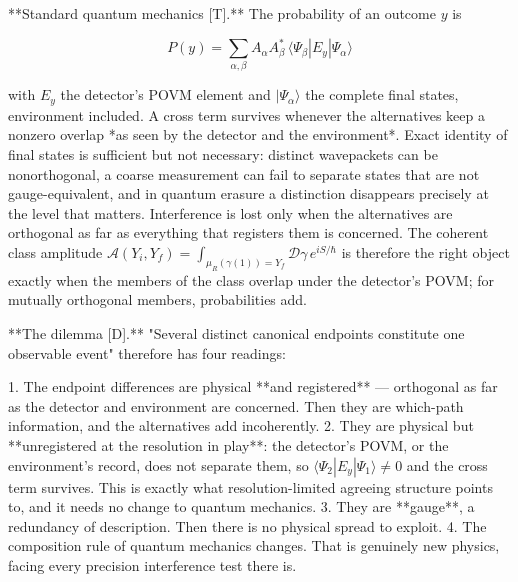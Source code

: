 **Standard quantum mechanics [T].** The probability of an outcome $y$ is

$$P(y) = \sum_{\alpha,\beta}A_\alpha A_\beta^*\,\langle\Psi_\beta|E_y|\Psi_\alpha\rangle$$

with $E_y$ the detector's POVM element and $|\Psi_\alpha\rangle$ the complete final states, environment included. A cross term survives whenever the alternatives keep a nonzero overlap *as seen by the detector and the environment*. Exact identity of final states is sufficient but not necessary: distinct wavepackets can be nonorthogonal, a coarse measurement can fail to separate states that are not gauge-equivalent, and in quantum erasure a distinction disappears precisely at the level that matters. Interference is lost only when the alternatives are orthogonal as far as everything that registers them is concerned. The coherent class amplitude $\mathcal A(Y_i,Y_f) = \int_{\mu_R(\gamma(1)) = Y_f}\mathcal D\gamma\,e^{iS/\hbar}$ is therefore the right object exactly when the members of the class overlap under the detector's POVM; for mutually orthogonal members, probabilities add.

**The dilemma [D].** "Several distinct canonical endpoints constitute one observable event" therefore has four readings:

1. The endpoint differences are physical **and registered** — orthogonal as far as the detector and environment are concerned. Then they are which-path information, and the alternatives add incoherently.
2. They are physical but **unregistered at the resolution in play**: the detector's POVM, or the environment's record, does not separate them, so $\langle\Psi_2|E_y|\Psi_1\rangle\neq0$ and the cross term survives. This is exactly what resolution-limited agreeing structure points to, and it needs no change to quantum mechanics.
3. They are **gauge**, a redundancy of description. Then there is no physical spread to exploit.
4. The composition rule of quantum mechanics changes. That is genuinely new physics, facing every precision interference test there is.

